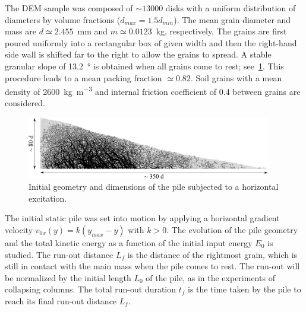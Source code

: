 The DEM sample was composed of $\sim13000$ disks with a uniform distribution of 
diameters by volume fractions ($d_{max} = 1.5 d_{min}$). The mean grain 
diameter and mass are $d\simeq 2.455 $~\si{\mm} and $m\simeq 0.0123$~\si{\kg}, 
respectively. The grains are first poured uniformly into a rectangular box of 
given width and then the right-hand side wall is shifted far to the right 
to allow the grains to spread. A stable granular slope of 13.2~\si{\degree} is 
obtained when all grains come to rest; see~\cref{fig:slope_configuration}. This 
procedure leads to a mean packing fraction $\simeq 0.82$. Soil grains with a 
mean density of 2600~\si{\kg\per\m\cubed} and internal friction coefficient of 
0.4 between grains are considered.

\begin{figure}[tbhp]
\includegraphics[width=0.95\textwidth]{slope_configuration}
\caption{Initial geometry and dimensions of the pile subjected to a horizontal 
excitation.}
\label{fig:slope_configuration}
\end{figure}


The initial static pile was set into motion by applying a horizontal
gradient velocity $v_{0x}(y) = k (y_{max} - y)$ with $k>0$. The evolution of 
the pile geometry and the total kinetic energy as a function of the initial 
input energy $E_0$ is studied. The run-out distance $L_f$ is the distance of 
the rightmost grain, which is still in contact with the main mass when the pile 
comes to rest. The run-out will be normalized by the initial length $L_0$ of 
the pile, as in the experiments of collapsing columns. The total run-out 
duration $t_f$ is the time taken by the pile to reach its final run-out 
distance $L_f$.

